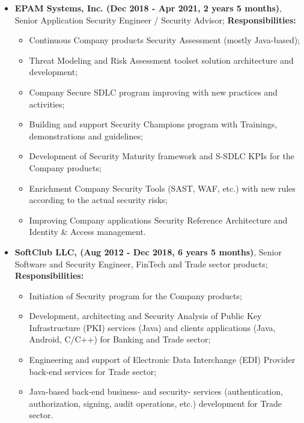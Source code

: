 \documentclass[a4paper, 12pt]{article}
\newcommand{\position}[1]{
    \textbf{#1}}
\begin{document}
    \begin{itemize}
        \item \position{EPAM Systems, Inc. (Dec 2018 - Apr 2021, 2 years 5 months)}, Senior Application Security Engineer / Security Advisor;
        \newline
        \newline
            \textbf{Responsibilities:}
			\begin{itemize}
				\item Continuous Company products Security Assessment (mostly Java-based);
  				\item Threat Modeling and Risk Assessment toolset solution architecture and development;
  				\item Company Secure SDLC program improving with new practices and activities; 
  				\item Building and support Security Champions program with Trainings, demonstrations and guidelines;
  				\item Development of Security Maturity framework and S-SDLC KPIs for the Company products;
  				\item Enrichment Company Security Tools (SAST, WAF, etc.) with new rules according to the actual security risks;
  				\item Improving Company applications Security Reference Architecture and Identity \& Access management.
  				\newline
  				\newline
			\end{itemize}
    \end{itemize} 
            
    \begin{itemize}
        \item \position{SoftClub LLC, (Aug 2012 - Dec 2018, 6 years 5 months)}, Senior Software and Security Engineer, FinTech and Trade sector products;
        \newline
        \newline
            \textbf{Responsibilities:}
			\begin{itemize}
				\item Initiation of Security program for the Company products;
  				\item Development, architecting and Security Analysis of Public Key Infrastructure (PKI) services (Java) and clients applications (Java, Android, C/C++) for Banking and Trade sector;
  				\item Engineering and support of Electronic Data Interchange (EDI) Provider back-end services for Trade sector;
				\item Java-based back-end business- and security- services (authentication, authorization, signing, audit operations, etc.) development for Trade sector.
			\end{itemize}
    \end{itemize}
\end{document}
